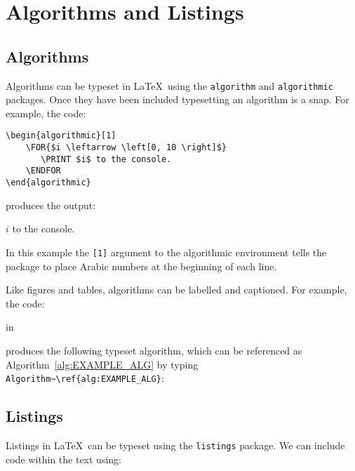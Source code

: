 

\chapter{Algorithms and Listings}

\section{Algorithms}

Algorithms can be typeset in \LaTeX\ using the \verb|algorithm|
and \verb|algorithmic| packages. Once they have been included
typesetting an algorithm is a snap. For example, the code:

\begin{verbatim}
\begin{algorithmic}[1]        
	\FOR{$i \leftarrow \left[0, 10 \right]$}
	   \PRINT $i$ to the console.
	\ENDFOR
\end{algorithmic}
\end{verbatim}

\noindent produces the output:

\begin{algorithmic}[1]        
	   \PRINT $i$ to the console.
	\ENDFOR
\end{algorithmic}

In this example the \verb|[1]| argument to the algorithmic 
environment tells the package to place Arabic numbers at
the beginning of each line.

Like figures and tables, algorithms can be labelled and
captioned.  For example, the code:

 in


	
\noindent produces the following typeset algorithm, which can 
be referenced as Algorithm~\ref{alg:EXAMPLE_ALG} by typing
\verb|Algorithm~\ref{alg:EXAMPLE_ALG}|:
	


\section{Listings}

Listings in \LaTeX\ can be typeset using the \verb|listings|
package.  We can include code within the text using:

